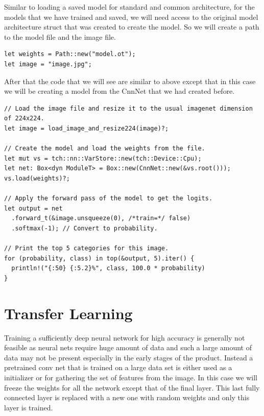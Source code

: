 \documentclass{book}
\begin{document}
Similar to loading a saved model for standard and common architecture, for the models that we have trained and saved, we will need access to the original model architecture struct that was created to create the model. So we will create a path to the model file and the image file.

\begin{lstlisting}[caption={chapter6/pytorch-image-classification/src/main.rs}, basicstyle=\small]
let weights = Path::new("model.ot");
let image = "image.jpg";
\end{lstlisting}

After that the code that we will see are similar to above except that in this case we will be creating a model from the CnnNet that we had created before.

\begin{lstlisting}[caption={chapter6/pytorch-image-classification/src/main.rs}, basicstyle=\small]
// Load the image file and resize it to the usual imagenet dimension of 224x224.
let image = load_image_and_resize224(image)?;

// Create the model and load the weights from the file.
let mut vs = tch::nn::VarStore::new(tch::Device::Cpu);
let net: Box<dyn ModuleT> = Box::new(CnnNet::new(&vs.root()));
vs.load(weights)?;

// Apply the forward pass of the model to get the logits.
let output = net
  .forward_t(&image.unsqueeze(0), /*train=*/ false)
  .softmax(-1); // Convert to probability.

// Print the top 5 categories for this image.
for (probability, class) in top(&output, 5).iter() {
  println!("{:50} {:5.2}%", class, 100.0 * probability)
}
\end{lstlisting}
\label{sub:Pretrained models}

\label{sec:Image Classification}

\section{Transfer Learning}%
Training a sufficiently deep neural network for high accuracy is generally not feasible as neural nets require huge amount of data and such a large amount of data may not be present especially in the early stages of the product. Instead a pretrained conv net that is trained on a large data set is either used as a initializer or for gathering the set of features from the image. In this case we will freeze the weights for all the network except that of the final layer. This last fully connected layer is replaced with a new one with random weights and only this layer is trained.
\end{document}
